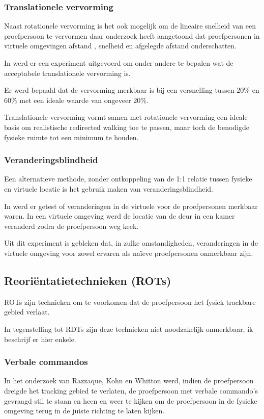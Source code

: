 \documentclass[a4paper,12pt]{article}
\begin{document}
\subsubsection{Translationele vervorming}
Naast rotationele vervorming is het ook mogelijk om de lineaire snelheid van een
proefpersoon te vervormen daar onderzoek heeft aangetoond dat proefpersonen in 
virtuele omgevingen afstand \cite{loomis03}, snelheid \cite{banton05} en 
afgelegde afstand \cite{frenz07} onderschatten.

In \cite{steinicke09} werd er een experiment uitgevoerd om onder andere te 
bepalen wat de acceptabele translationele vervorming is.

Er werd bepaald dat de vervorming merkbaar is bij een versnelling tussen 20\% en
60\% met een ideale waarde van ongeveer 20\%.

Translationele vervorming vormt samen met rotationele vervorming een ideale basis 
om realistische redirected walking toe te passen, maar toch de benodigde fysieke 
ruimte tot een minimum te houden.


\subsubsection{Veranderingsblindheid}
Een alternatieve methode, zonder ontkoppeling van de 1:1 relatie tussen fysieke 
en virtuele locatie is het gebruik maken van veranderingsblindheid.

In \cite{suma11} werd er getest of veranderingen in de virtuele voor de
proefpersonen merkbaar waren. In een virtuele omgeving werd de locatie van de
deur in een kamer veranderd zodra de proefpersoon weg keek.

Uit dit experiment is gebleken dat, in zulke omstandigheden, veranderingen in de
virtuele omgeving voor zowel ervaren als na\"ieve proefpersonen onmerkbaar zijn.


\subsection{Reori\"entatietechnieken (ROTs)}
ROTs zijn technieken om te voorkomen dat de proefpersoon het fysiek trackbare 
gebied verlaat.

In tegenstelling tot RDTs zijn deze technieken niet noodzakelijk onmerkbaar, ik
beschrijf er hier enkele.


\subsubsection{Verbale commandos}
In het onderzoek van Razzaque, Kohn en Whitton \cite{kohn01} werd, indien de
proefpersoon dreigde het tracking gebied te verlaten, de proefpersoon met verbale
commando's gevraagd stil te staan en heen en weer te kijken om de proefpersoon in
de fysieke omgeving terug in de juiste richting te laten kijken.
\end{document}

